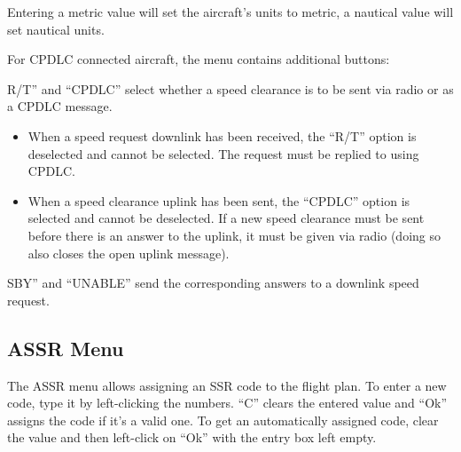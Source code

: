 \documentclass[a4paper,oneside,11pt]{memoir}
\begin{document}
\bigskip

Entering a metric value will set the aircraft’s units to metric, a nautical value will set nautical units.

\bigskip

For CPDLC connected aircraft, the menu contains additional buttons:

\bigskip

R/T” and “CPDLC” select whether a speed clearance is to be sent via radio or as a
CPDLC message.

\bigskip

\begin{itemize}
    \item When a speed request downlink has been received, the “R/T” option is deselected and cannot be selected. The request must be replied to using CPDLC.
    \item When a speed clearance uplink has been sent, the “CPDLC” option is selected and cannot be deselected. If a new speed clearance must be sent before there is an answer to the uplink, it must be given via radio (doing so also closes the open uplink message).
\end{itemize}

\bigskip

SBY” and “UNABLE” send the corresponding answers to a downlink speed request.


\subsection{ASSR Menu}
\label{menu:assr}

The ASSR menu allows assigning an SSR code to the flight plan. To enter a new code, type it by left-clicking the numbers. “C” clears the entered value and “Ok” assigns the code if it’s a valid one. To get an automatically assigned code, clear the value and then left-click on “Ok” with the entry box left empty.

%
%
\end{document}
